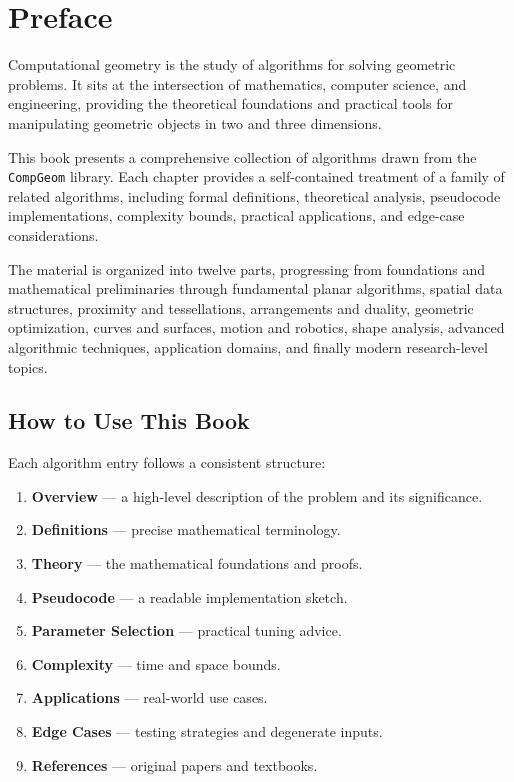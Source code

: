 \chapter*{Preface}

Computational geometry is the study of algorithms for solving geometric problems. It sits at the intersection of mathematics, computer science, and engineering, providing the theoretical foundations and practical tools for manipulating geometric objects in two and three dimensions.

This book presents a comprehensive collection of algorithms drawn from the \texttt{CompGeom} library. Each chapter provides a self-contained treatment of a family of related algorithms, including formal definitions, theoretical analysis, pseudocode implementations, complexity bounds, practical applications, and edge-case considerations.

The material is organized into twelve parts, progressing from foundations and mathematical preliminaries through fundamental planar algorithms, spatial data structures, proximity and tessellations, arrangements and duality, geometric optimization, curves and surfaces, motion and robotics, shape analysis, advanced algorithmic techniques, application domains, and finally modern research-level topics.

\section*{How to Use This Book}
Each algorithm entry follows a consistent structure:
\begin{enumerate}[label=\textbf{\arabic*.}]
  \item \textbf{Overview} --- a high-level description of the problem and its significance.
  \item \textbf{Definitions} --- precise mathematical terminology.
  \item \textbf{Theory} --- the mathematical foundations and proofs.
  \item \textbf{Pseudocode} --- a readable implementation sketch.
  \item \textbf{Parameter Selection} --- practical tuning advice.
  \item \textbf{Complexity} --- time and space bounds.
  \item \textbf{Applications} --- real-world use cases.
  \item \textbf{Edge Cases} --- testing strategies and degenerate inputs.
  \item \textbf{References} --- original papers and textbooks.
\end{enumerate}

